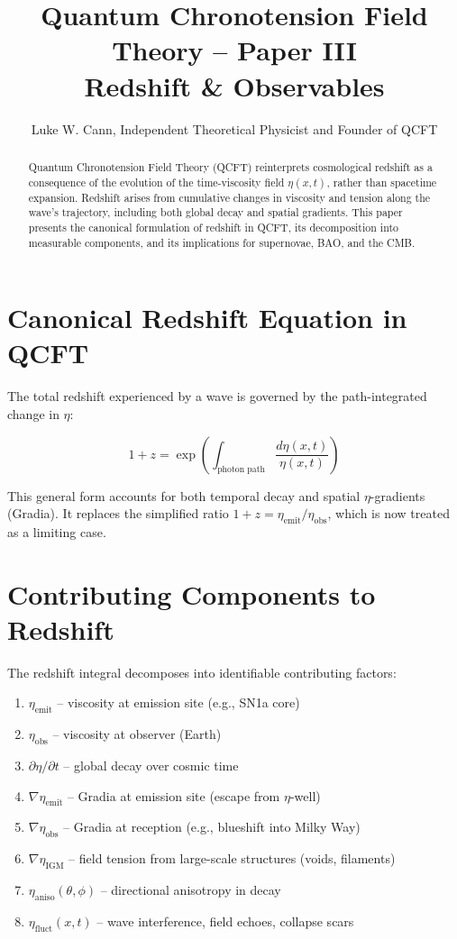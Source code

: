 \documentclass[12pt]{article}
\title{Quantum Chronotension Field Theory – Paper III\\\large Redshift \& Observables}
\author{Luke W. Cann, Independent Theoretical Physicist and Founder of QCFT}
\date{}
\begin{document}
\maketitle

\begin{abstract}
Quantum Chronotension Field Theory (QCFT) reinterprets cosmological redshift as a consequence of the evolution of the time-viscosity field $\eta(x,t)$, rather than spacetime expansion. Redshift arises from cumulative changes in viscosity and tension along the wave's trajectory, including both global decay and spatial gradients. This paper presents the canonical formulation of redshift in QCFT, its decomposition into measurable components, and its implications for supernovae, BAO, and the CMB.
\end{abstract}

\section{Canonical Redshift Equation in QCFT}

The total redshift experienced by a wave is governed by the path-integrated change in $\eta$:

\[
1 + z = \exp\left( \int_{\text{photon path}} \frac{d\eta(x,t)}{\eta(x,t)} \right)
\]

This general form accounts for both temporal decay and spatial $\eta$-gradients (Gradia). It replaces the simplified ratio $1 + z = \eta_{\text{emit}} / \eta_{\text{obs}}$, which is now treated as a limiting case.

\section{Contributing Components to Redshift}

The redshift integral decomposes into identifiable contributing factors:

\begin{enumerate}
    \item $\eta_{\text{emit}}$ – viscosity at emission site (e.g., SN1a core)
    \item $\eta_{\text{obs}}$ – viscosity at observer (Earth)
    \item $\partial \eta / \partial t$ – global decay over cosmic time
    \item $\nabla \eta_{\text{emit}}$ – Gradia at emission site (escape from $\eta$-well)
    \item $\nabla \eta_{\text{obs}}$ – Gradia at reception (e.g., blueshift into Milky Way)
    \item $\nabla \eta_{\text{IGM}}$ – field tension from large-scale structures (voids, filaments)
    \item $\eta_{\text{aniso}}(\theta,\phi)$ – directional anisotropy in decay
    \item $\eta_{\text{fluct}}(x,t)$ – wave interference, field echoes, collapse scars
\end{enumerate}
\end{document}
